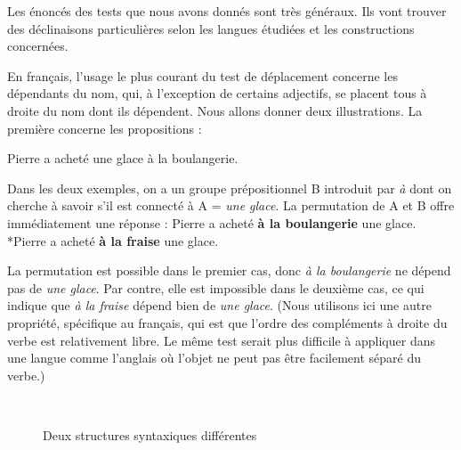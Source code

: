 Les énoncés des tests que nous avons donnés sont très généraux. Ils vont trouver des déclinaisons particulières selon les langues étudiées et les constructions concernées.

En français, l’usage le plus courant du test de déplacement concerne les dépendants du nom, qui, à l’exception de certains adjectifs, se placent tous à droite du nom dont ils dépendent. Nous allons donner deux illustrations. La première concerne les propositions :

\ea
    {Pierre a acheté une glace à la boulangerie.}
\z
{}
\z

Dans les deux exemples, on a un groupe prépositionnel B introduit par \textit{à} dont on cherche à savoir s’il est connecté à A = \textit{une glace}. La permutation de A et B offre immédiatement une réponse :
\ea
    {Pierre a acheté} \textbf{{à la boulangerie}}  {une glace.}
\z
\ea
    *{Pierre a acheté} \textbf{{à la fraise}}  {une glace.}
\z

La permutation est possible dans le premier cas, donc \textit{à la boulangerie} ne dépend pas de \textit{une glace}. Par contre, elle est impossible dans le deuxième cas, ce qui indique que \textit{à la fraise} dépend bien de \textit{une glace}. (Nous utilisons ici une autre propriété, spécifique au français, qui est que l’ordre des compléments à droite du verbe est relativement libre. Le même test serait plus difficile à appliquer dans une langue comme l’anglais où l’objet ne peut pas être facilement séparé du verbe.)

\begin{figure}
\medskip\\
\caption{\label{fig:}Deux structures syntaxiques différentes}
\end{figure}

